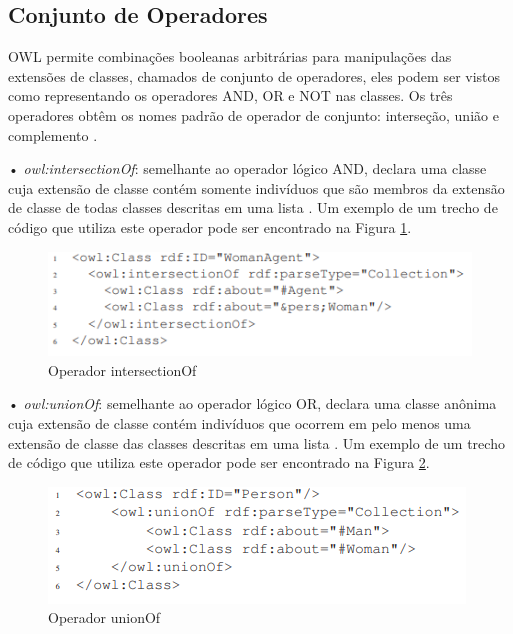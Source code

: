 \documentclass{bcc}
\begin{document}
\subsection{Conjunto de Operadores}

OWL permite combinações booleanas arbitrárias para manipulações das extensões de classes, chamados de conjunto de operadores, eles podem ser vistos como representando os operadores AND, OR e NOT nas classes. Os três operadores obtêm os nomes padrão de operador de conjunto: interseção, união e complemento \cite{bechhofer2004}.

• \textit{owl:intersectionOf}: semelhante ao operador lógico AND, declara uma classe cuja extensão de classe contém somente indivíduos que são membros da extensão de classe de todas classes descritas em uma lista \cite{bechhofer2004}. Um exemplo de um trecho de código que utiliza este operador pode ser encontrado na Figura \ref{fig:opand}.

\begin{figure}[H]
\centering
\includegraphics[width=.9\textwidth]{Figuras/op_and.PNG}
\caption{Operador intersectionOf}
\label{fig:opand}
\end{figure}


• \textit{owl:unionOf}: semelhante ao operador lógico OR, declara uma classe anônima cuja extensão de classe contém indivíduos que ocorrem em pelo menos uma extensão de classe das classes descritas em uma lista \cite{bechhofer2004}. Um exemplo de um trecho de código que utiliza este operador pode ser encontrado na Figura \ref{fig:opor}.

\begin{figure}[H]
\centering
\includegraphics[width=.9\textwidth]{Figuras/op_or.PNG}
\caption{Operador unionOf}
\label{fig:opor}
\end{figure}
\end{document}
